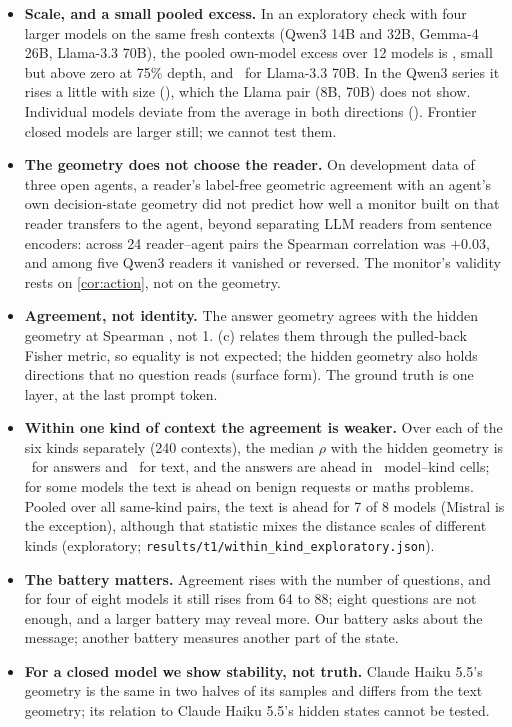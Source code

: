 \begin{itemize}
\item \textbf{Scale, and a small pooled excess.} In an exploratory check with four larger models on the same fresh contexts (Qwen3 14B and 32B, Gemma-4 26B, Llama-3.3 70B), the pooled own-model excess over 12 models is \ScaleAll, small but above zero at 75\% depth, and \ScaleLlama\ for Llama-3.3 70B. In the Qwen3 series it rises a little with size (\ScaleQwen), which the Llama pair (8B, 70B) does not show. Individual models deviate from the average in both directions (\GSixPerModel). Frontier closed models are larger still; we cannot test them.
\item \textbf{The geometry does not choose the reader.} On development data of three open agents, a reader's label-free geometric agreement with an agent's own decision-state geometry did not predict how well a monitor built on that reader transfers to the agent, beyond separating LLM readers from sentence encoders: across 24 reader--agent pairs the Spearman correlation was $+0.03$, and among five Qwen3 readers it vanished or reversed. The monitor's validity rests on \cref{cor:action}, not on the geometry.
\item \textbf{Agreement, not identity.} The answer geometry agrees with the hidden geometry at Spearman \GOneAns, not 1. (c) relates them through the pulled-back Fisher metric, so equality is not expected; the hidden geometry also holds directions that no question reads (surface form). The ground truth is one layer, at the last prompt token.
\item \textbf{Within one kind of context the agreement is weaker.} Over each of the six kinds separately (240 contexts), the median $\rho$ with the hidden geometry is \WKAns\ for answers and \WKText\ for text, and the answers are ahead in \WKCells\ model--kind cells; for some models the text is ahead on benign requests or maths problems. Pooled over all same-kind pairs, the text is ahead for 7 of 8 models (Mistral is the exception), although that statistic mixes the distance scales of different kinds (exploratory; \texttt{results/t1/within\_kind\_exploratory.json}).
\item \textbf{The battery matters.} Agreement rises with the number of questions, and for four of eight models it still rises from 64 to 88; eight questions are not enough, and a larger battery may reveal more. Our battery asks about the message; another battery measures another part of the state.
\item \textbf{For a closed model we show stability, not truth.} Claude Haiku 5.5's geometry is the same in two halves of its samples and differs from the text geometry; its relation to Claude Haiku 5.5's hidden states cannot be tested.

\end{itemize}
